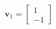 \documentclass[preview]{standalone}
\begin{document}
\begin{align*}
\mathbf{v}_1=\begin{bmatrix} 1 \\ -1 \end{bmatrix}
\end{align*}
\end{document}
